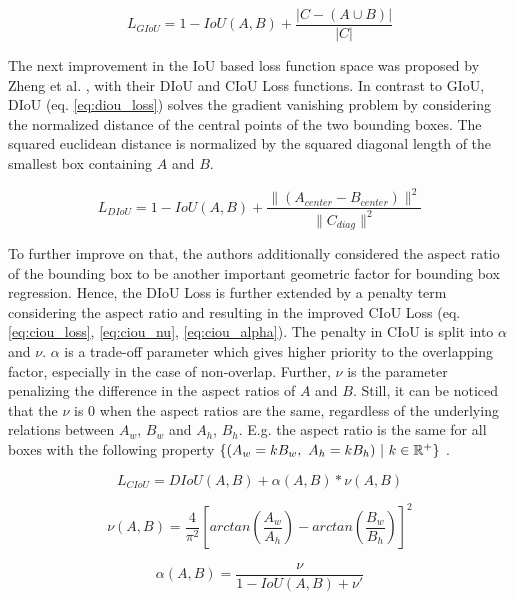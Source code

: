 \begin{equation}
    L_{GIoU} = 1 - IoU(A, B) + \frac{|C - (A \cup B)|}{|C|}
    \label{eq:giou_loss}
\end{equation}

The next improvement in the \ac{IoU} based loss function space was proposed by Zheng et al. \cite{diou}, with their \ac{DIoU} and \ac{CIoU} Loss functions.
In contrast to \ac{GIoU}, \ac{DIoU} (eq. \ref{eq:diou_loss}) solves the gradient vanishing problem by considering the normalized distance of the central points of the two bounding boxes.
The squared euclidean distance is normalized by the squared diagonal length of the smallest box containing $A$ and $B$.

\begin{equation}
    L_{DIoU} = 1 - IoU(A, B) + \frac{\|(A_{center} - B_{center})\|^2}{\|C_{diag}\|^2}
    \label{eq:diou_loss}
\end{equation}

To further improve on that, the authors additionally considered the aspect ratio of the bounding box to be another important geometric factor for bounding box regression.
Hence, the \ac{DIoU} Loss is further extended by a penalty term considering the aspect ratio and resulting in the improved \ac{CIoU} Loss (eq. \ref{eq:ciou_loss}, \ref{eq:ciou_nu}, \ref{eq:ciou_alpha}).
The penalty in \ac{CIoU} is split into $\alpha$ and $\nu$.
$\alpha$ is a trade-off parameter which gives higher priority to the overlapping factor, especially in the case of non-overlap.
Further, $\nu$ is the parameter penalizing the difference in the aspect ratios of $A$ and $B$.
Still, it can be noticed that the $\nu$ is $0$ when the aspect ratios are the same, regardless of the underlying relations between $A_w$, $B_w$ and $A_h$, $B_h$.
E.g. the aspect ratio is the same for all boxes with the following property $\{ (A_w=kB_w, \ A_h=kB_h)\ |\ k \in \mathbb{R}^+\}$ \cite{eiou}.

\begin{equation}
    L_{CIoU} = DIoU(A, B) + \alpha(A,B) * \nu(A, B)
    \label{eq:ciou_loss}
\end{equation}

\begin{equation}
    \nu(A, B) = \frac{4}{\pi^2} [arctan(\frac{A_w}{A_h}) - arctan(\frac{B_w}{B_h})]^2
    \label{eq:ciou_nu}
\end{equation}

\begin{equation}
    \alpha(A, B) = \frac{\nu}{1 - IoU(A, B) + \nu'}
    \label{eq:ciou_alpha}
\end{equation}

